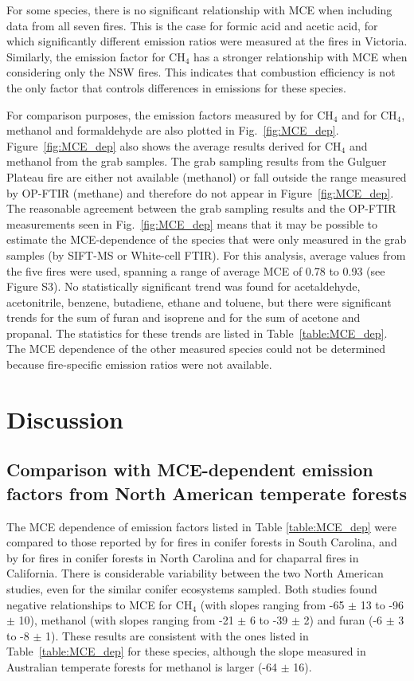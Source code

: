 \documentclass[acp, manuscript]{copernicus}
\begin{document}
For some species, there is no significant relationship with MCE when including data from all seven fires. This is the case for formic acid and acetic acid, for which significantly different emission ratios were measured at the fires in Victoria. Similarly, the emission factor for CH$_4$ has a stronger relationship with MCE when considering only the NSW fires. This indicates that combustion efficiency is not the only factor that controls differences in emissions for these species. 

For comparison purposes, the emission factors measured by \citet{Hurst1996} for CH$_4$ and \citet{Lawson2015} for CH$_4$, methanol and formaldehyde are also plotted in Fig.~\ref{fig:MCE_dep}. Figure~\ref{fig:MCE_dep} also shows the average results derived for CH$_4$ and methanol from the grab samples. The grab sampling results from the Gulguer Plateau fire are either not available (methanol) or fall outside the range measured by OP-FTIR (methane) and therefore do not appear in Figure~\ref{fig:MCE_dep}. The reasonable agreement between the grab sampling results and the OP-FTIR measurements seen in Fig.~\ref{fig:MCE_dep} means that it may be possible to estimate the MCE-dependence of the species that were only measured in the grab samples (by SIFT-MS or White-cell FTIR). For this analysis, average values from the five fires were used, spanning a range of average MCE of 0.78 to 0.93 (see Figure S3). No statistically significant trend was found for acetaldehyde, acetonitrile, benzene, butadiene, ethane and toluene, but there were significant trends for the sum of furan and isoprene and for the sum of acetone and propanal. The statistics for these trends are listed in Table~\ref{table:MCE_dep}. The MCE dependence of the other measured species could not be determined because fire-specific emission ratios were not available. 

\section{Discussion}

\subsection{Comparison with MCE-dependent emission factors from North American temperate forests}

The MCE dependence of emission factors listed in Table \ref{table:MCE_dep} were compared to those reported by \citet{Akagi2013} for fires in conifer forests in South Carolina, and by \citet{Burling2011} for fires in conifer forests in North Carolina and for chaparral fires in California. There is considerable variability between the two North American studies, even for the similar conifer ecosystems sampled. 
Both studies found negative relationships to MCE for CH$_4$ (with slopes ranging from -65 $\pm$ 13 to -96 $\pm$ 10), methanol (with slopes ranging from -21 $\pm$ 6 to -39 $\pm$ 2) and furan (-6 $\pm$ 3 to -8 $\pm$ 1). These results are consistent with the ones listed in Table~\ref{table:MCE_dep} for these species, although the slope measured in Australian temperate forests for methanol is larger (-64 $\pm$ 16). 
\end{document}
